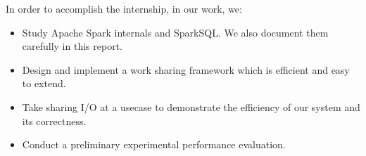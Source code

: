 In order to accomplish the internship, in our work, we:\\
\begin{itemize}
\item Study Apache Spark internals and SparkSQL. We also document them carefully in this report.
\item Design and implement a work sharing framework which is efficient and easy to extend.
\item Take sharing I/O at a usecase to demonstrate the efficiency of our system and its correctness.
\item Conduct a preliminary experimental performance evaluation.
\end{itemize}



